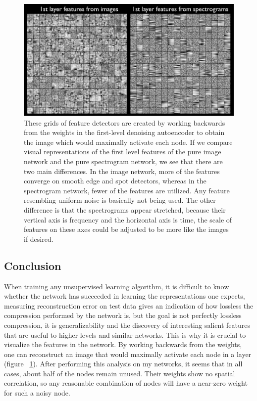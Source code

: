 \documentclass[12pt]{article}
\begin{document}
\begin{doublespacing}
\begin{figure}[p]
\centering
\includegraphics[width=6in]{feature_comparison}
\caption{These grids of feature detectors are created by working backwards from the weights in the first-level denoising autoencoder to obtain the image which would maximally activate each node. If we compare visual representations of the first level features of the pure image network and the pure spectrogram network, we see that there are two main differences. In the image network, more of the features converge on smooth edge and spot detectors, whereas in the spectrogram network, fewer of the features are utilized. Any feature resembling uniform noise is basically not being used. The other difference is that the spectrograms appear stretched, because their vertical axis is frequency and the horizontal axis is time, the scale of features on these axes could be adjusted to be more like the images if desired.}
\label{fig:feature_comparison}
\end{figure}
	

	
	\subsection{Conclusion}
	
	When training any unsupervised learning algorithm, it is difficult to know whether the network has succeeded in learning the representations one expects, measuring reconstruction error on test data gives an indication of how lossless the compression performed by the network is, but the goal is not perfectly lossless compression, it is generalizability and the discovery of interesting salient features that are useful to higher levels and similar networks. This is why it is crucial to visualize the features in the network. By working backwards from the weights, one can reconstruct an image that would maximally activate each node in a layer (figure ~\ref{fig:feature_comparison}). After performing this analysis on my networks, it seems that in all cases, about half of the nodes remain unused. Their weights show no spatial correlation, so any reasonable combination of nodes will have a near-zero weight for such a noisy node.
		

\end{doublespacing}
\end{document}
